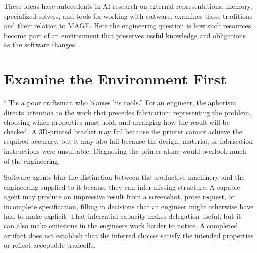 These ideas have antecedents in AI research on external representations, memory, specialized solvers, and tools for working with software.  examines those traditions and their relation to MAGE. Here the engineering question is how such resources become part of an environment that preserves useful knowledge and obligations as the software changes.

\section{Examine the Environment First}\label{heading:whose-fault-is-it}



“’Tis a poor craftsman who blames his tools.” For an engineer, the aphorism directs attention to the work that precedes fabrication: representing the problem, choosing which properties must hold, and arranging how the result will be checked. A 3D-printed bracket may fail because the printer cannot achieve the required accuracy, but it may also fail because the design, material, or fabrication instructions were unsuitable. Diagnosing the printer alone would overlook much of the engineering.


Software agents blur the distinction between the productive machinery and the engineering supplied to it because they can infer missing structure. A capable agent may produce an impressive result from a screenshot, prose request, or incomplete specification, filling in decisions that an engineer might otherwise have had to make explicit. That inferential capacity makes delegation useful, but it can also make omissions in the engineer\textquotesingle s work harder to notice. A completed artifact does not establish that the inferred choices satisfy the intended properties or reflect acceptable tradeoffs.

